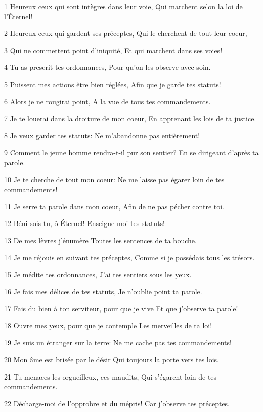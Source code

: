 \par 1 Heureux ceux qui sont intègres dans leur voie, Qui marchent selon la loi de l'Éternel!
\par 2 Heureux ceux qui gardent ses préceptes, Qui le cherchent de tout leur coeur,
\par 3 Qui ne commettent point d'iniquité, Et qui marchent dans ses voies!
\par 4 Tu as prescrit tes ordonnances, Pour qu'on les observe avec soin.
\par 5 Puissent mes actions être bien réglées, Afin que je garde tes statuts!
\par 6 Alors je ne rougirai point, A la vue de tous tes commandements.
\par 7 Je te louerai dans la droiture de mon coeur, En apprenant les lois de ta justice.
\par 8 Je veux garder tes statuts: Ne m'abandonne pas entièrement!
\par 9 Comment le jeune homme rendra-t-il pur son sentier? En se dirigeant d'après ta parole.
\par 10 Je te cherche de tout mon coeur: Ne me laisse pas égarer loin de tes commandements!
\par 11 Je serre ta parole dans mon coeur, Afin de ne pas pécher contre toi.
\par 12 Béni sois-tu, ô Éternel! Enseigne-moi tes statuts!
\par 13 De mes lèvres j'énumère Toutes les sentences de ta bouche.
\par 14 Je me réjouis en suivant tes préceptes, Comme si je possédais tous les trésors.
\par 15 Je médite tes ordonnances, J'ai tes sentiers sous les yeux.
\par 16 Je fais mes délices de tes statuts, Je n'oublie point ta parole.
\par 17 Fais du bien à ton serviteur, pour que je vive Et que j'observe ta parole!
\par 18 Ouvre mes yeux, pour que je contemple Les merveilles de ta loi!
\par 19 Je suis un étranger sur la terre: Ne me cache pas tes commandements!
\par 20 Mon âme est brisée par le désir Qui toujours la porte vers tes lois.
\par 21 Tu menaces les orgueilleux, ces maudits, Qui s'égarent loin de tes commandements.
\par 22 Décharge-moi de l'opprobre et du mépris! Car j'observe tes préceptes.
